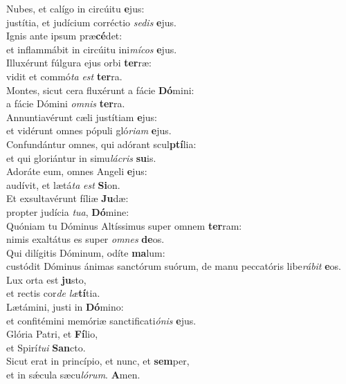 \evenverse Nubes, et calígo in circúitu \textbf{e}jus:~\*\\
\evenverse justítia, et judícium corréctio \textit{se}\textit{dis} \textbf{e}jus.\\
\oddverse Ignis ante ipsum præ\textbf{cé}det:~\*\\
\oddverse et inflammábit in circúitu ini\textit{mí}\textit{cos} \textbf{e}jus.\\
\evenverse Illuxérunt fúlgura ejus orbi \textbf{ter}ræ:~\*\\
\evenverse vidit et commó\textit{ta} \textit{est} \textbf{ter}ra.\\
\oddverse Montes, sicut cera fluxérunt a fácie \textbf{Dó}mini:~\*\\
\oddverse a fácie Dómini \textit{om}\textit{nis} \textbf{ter}ra.\\
\evenverse Annuntiavérunt cæli justítiam \textbf{e}jus:~\*\\
\evenverse et vidérunt omnes pópuli gló\textit{ri}\textit{am} \textbf{e}jus.\\
\oddverse Confundántur omnes, qui adórant scul\textbf{ptí}lia:~\*\\
\oddverse et qui gloriántur in simu\textit{lá}\textit{cris} \textbf{su}is.\\
\evenverse Adoráte eum, omnes Angeli \textbf{e}jus:~\*\\
\evenverse audívit, et lætá\textit{ta} \textit{est} \textbf{Si}on.\\
\oddverse Et exsultavérunt fíliæ \textbf{Ju}dæ:~\*\\
\oddverse propter judícia \textit{tu}\textit{a}, \textbf{Dó}mine:\\
\evenverse Quóniam tu Dóminus Altíssimus super omnem \textbf{ter}ram:~\*\\
\evenverse nimis exaltátus es super \textit{om}\textit{nes} \textbf{de}os.\\
\oddverse Qui dilígitis Dóminum, odíte \textbf{ma}lum:~\*\\
\oddverse custódit Dóminus ánimas sanctórum suórum, de manu peccatóris libe\textit{rá}\textit{bit} \textbf{e}os.\\
\evenverse Lux orta est \textbf{ju}sto,~\*\\
\evenverse et rectis cor\textit{de} \textit{læ}\textbf{tí}tia.\\
\oddverse Lætámini, justi in \textbf{Dó}mino:~\*\\
\oddverse et confitémini memóriæ sanctificati\textit{ó}\textit{nis} \textbf{e}jus.\\
\evenverse Glória Patri, et \textbf{Fí}lio,~\*\\
\evenverse et Spirí\textit{tu}\textit{i} \textbf{San}cto.\\
\oddverse Sicut erat in princípio, et nunc, et \textbf{sem}per,~\*\\
\oddverse et in sǽcula sæcu\textit{ló}\textit{rum}. \textbf{A}men.\\

